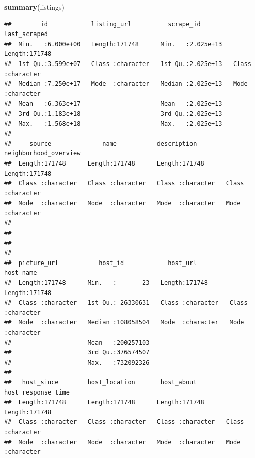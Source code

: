 \documentclass[
]{article}
\newenvironment{Shaded}{\begin{snugshade}}{\end{snugshade}}
\newcommand{\FunctionTok}[1]{\textcolor[rgb]{0.13,0.29,0.53}{\textbf{#1}}}
\newcommand{\NormalTok}[1]{#1}
\begin{document}
\begin{Shaded}
\begin{Highlighting}[]
\FunctionTok{summary}\NormalTok{(listings)}
\end{Highlighting}
\end{Shaded}

\begin{verbatim}
##        id            listing_url          scrape_id         last_scraped      
##  Min.   :6.000e+00   Length:171748      Min.   :2.025e+13   Length:171748     
##  1st Qu.:3.599e+07   Class :character   1st Qu.:2.025e+13   Class :character  
##  Median :7.250e+17   Mode  :character   Median :2.025e+13   Mode  :character  
##  Mean   :6.363e+17                      Mean   :2.025e+13                     
##  3rd Qu.:1.183e+18                      3rd Qu.:2.025e+13                     
##  Max.   :1.568e+18                      Max.   :2.025e+13                     
##                                                                               
##     source              name           description        neighborhood_overview
##  Length:171748      Length:171748      Length:171748      Length:171748        
##  Class :character   Class :character   Class :character   Class :character     
##  Mode  :character   Mode  :character   Mode  :character   Mode  :character     
##                                                                                
##                                                                                
##                                                                                
##                                                                                
##  picture_url           host_id            host_url          host_name        
##  Length:171748      Min.   :       23   Length:171748      Length:171748     
##  Class :character   1st Qu.: 26330631   Class :character   Class :character  
##  Mode  :character   Median :108058504   Mode  :character   Mode  :character  
##                     Mean   :200257103                                        
##                     3rd Qu.:376574507                                        
##                     Max.   :732092326                                        
##                                                                              
##   host_since        host_location       host_about        host_response_time
##  Length:171748      Length:171748      Length:171748      Length:171748     
##  Class :character   Class :character   Class :character   Class :character  
##  Mode  :character   Mode  :character   Mode  :character   Mode  :character  

\end{verbatim}
\end{document}
